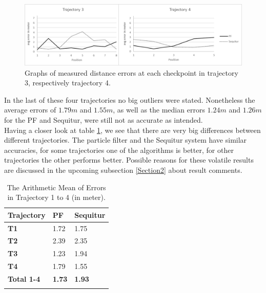 \begin{figure}[th]
\centering
\includegraphics[width=1.0\textwidth]{Figures/trajectory3_4_results}
\decoRule
\caption[Positioning Results Trajectory 3 and 4]{Graphs of measured distance errors at each checkpoint in trajectory 3, respectively trajectory 4.}
\label{fig:trajectory3and4_results}
\end{figure}In the last of these four trajectories no big outliers were stated. Nonetheless the average errors of $1.79m$ and $1.55m$, as well as the median errors $1.24m$ and $1.26m$ for the PF and Sequitur, were still not as accurate as intended.\\
\noindent\hspace*{5mm}%
Having a closer look at table \ref{tab:arithmetic_errors}, we see that there are very big differences between different trajectories. The particle filter and the Sequitur system have similar accuracies, for some trajectories one of the algorithms is better, for other trajectories the other performs better. Possible reasons for these volatile results are discussed in the upcoming subsection  \ref{Section2} about result comments. 

\begin{table}
\caption{The Arithmetic Mean of Errors in Trajectory 1 to 4 (in meter).}
\label{tab:arithmetic_errors}
\centering
\begin{tabular}{l l l}
\toprule
\textbf{Trajectory} & \textbf{PF} & \textbf{Sequitur}\\
\midrule
\textbf{T1} & 1.72 & 1.75\\
\textbf{T2} & 2.39 & 2.35\\
\textbf{T3} & 1.23 & 1.94\\
\textbf{T4} & 1.79 & 1.55\\
\midrule
\textbf{Total 1-4}  & \textbf{1.73} & \textbf{1.93}\\
\bottomrule\\
\end{tabular}
\end{table}



